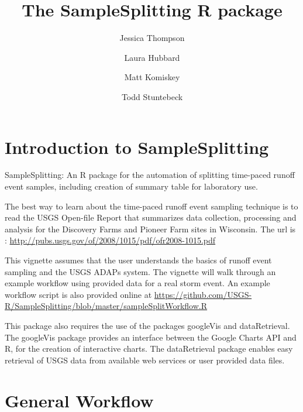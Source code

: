 \documentclass[a4paper,11pt]{article}\usepackage[]{graphicx}\usepackage[]{color}
\begin{document}
\title{The SampleSplitting R package}
\author[1]{Jessica Thompson}
\author[1]{Laura Hubbard}
\author[1]{Matt Komiskey}
\author[1]{Todd Stuntebeck}






\maketitle
\tableofcontents

\section{Introduction to SampleSplitting}

SampleSplitting: An R package for the automation of splitting time-paced runoff event samples, including creation of summary table for laboratory use.

The best way to learn about the time-paced runoff event sampling technique is to read the USGS Open-file Report that summarizes data collection, processing and analysis for the Discovery Farms and Pioneer Farm sites in Wisconsin. The url is \cite{Stuntebeck}:
\url{http://pubs.usgs.gov/of/2008/1015/pdf/ofr2008-1015.pdf}

This vignette assumes that the user understands the basics of runoff event sampling and the USGS ADAPs system. The vignette will walk through an example workflow using provided data for a real storm event. An example workflow script is also provided online at \url {https://github.com/USGS-R/SampleSplitting/blob/master/sampleSplitWorkflow.R}

This package also requires the use of the packages googleVis and dataRetrieval. The googleVis package provides an interface between the Google Charts API and R, for the creation of interactive charts. The dataRetrieval package enables easy retrieval of USGS data from available web services or user provided data files.

\section{General Workflow}
\end{document}
